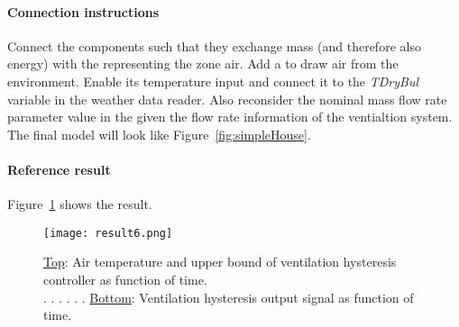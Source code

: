 \documentclass[10pt,a4paper]{article}
\begin{document}
\paragraph{Connection instructions}
Connect the components such that they exchange mass 
(and therefore also energy) with the 
representing the zone air.
Add a  to draw air from the environment.
Enable its temperature input and connect it to the \textit{TDryBul}
variable in the weather data reader. Also reconsider the nominal mass flow rate parameter value in the  given the flow rate information of the ventialtion system. The final model will look like
Figure~\ref{fig:simpleHouse}.

\paragraph{Reference result}
Figure~\ref{fig:res6} shows the result.

\begin{figure}[h!]
\centering
\texttt{[image: result6.png]}
\caption{\underline{Top}: Air temperature and upper bound of ventilation hysteresis controller as function of time. \\ . . . . . . \underline{Bottom}: Ventilation hysteresis output signal as function of time.}
\label{fig:res6}
\end{figure}
\end{document}
